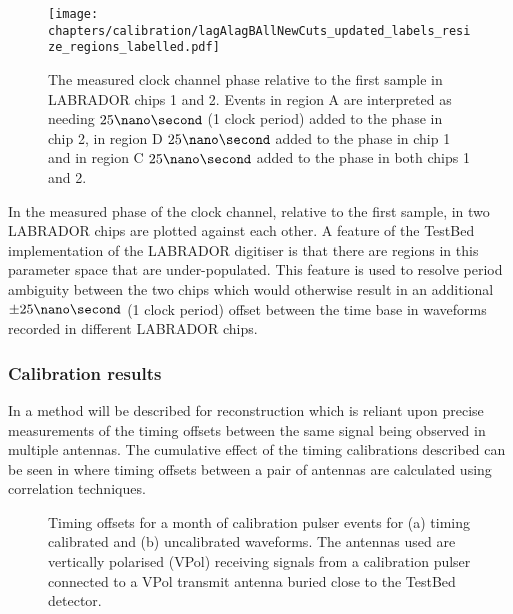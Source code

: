 \begin{figure}[htpb]
  \texttt{[image: chapters/calibration/lagAlagBAllNewCuts\_updated\_labels\_resize\_regions\_labelled.pdf]}
  \caption{The measured clock channel phase relative to the first sample in LABRADOR chips 1 and 2. Events in region A are interpreted as needing $25 \nano \second$ (1 clock period) added to the phase in chip 2, in region D $25 \nano \second$ added to the phase in chip 1 and in region C $25 \nano \second$ added to the phase in both chips 1 and 2.}
  \label{fig:calibration:LABRADOR-Digitiser-Chip:Swiss-flag}
\end{figure}

In  the measured phase of the clock channel, relative to the first sample, in two LABRADOR chips are plotted against each other. A feature of the TestBed implementation of the LABRADOR digitiser is that there are regions in this parameter space that are under-populated. This feature is used to resolve period ambiguity between the two chips which would otherwise result in an additional $\pm 25 \nano \second$ (1 clock period) offset between the time base in waveforms recorded in different LABRADOR chips.



\subsubsection{Calibration results}
\label{sec:calibration:LABRADOR-Digitiser-Chip:Calibration-results}

In  a method will be described for reconstruction which is reliant upon precise measurements of the timing offsets between the same signal being observed in multiple antennas. The cumulative effect of the timing calibrations described can be seen in  where timing offsets between a pair of antennas are calculated using correlation techniques.

\begin{figure}[htpb]
  \hfill
  \caption{Timing offsets for a month of calibration pulser events for (a) timing calibrated and (b) uncalibrated waveforms. The antennas used are vertically polarised (VPol) receiving signals from a calibration pulser connected to a VPol transmit antenna buried close to the TestBed detector.}
  \label{fig:calibration:LABRADOR-Digitiser-Chip:Timing-Differences}
\end{figure}

